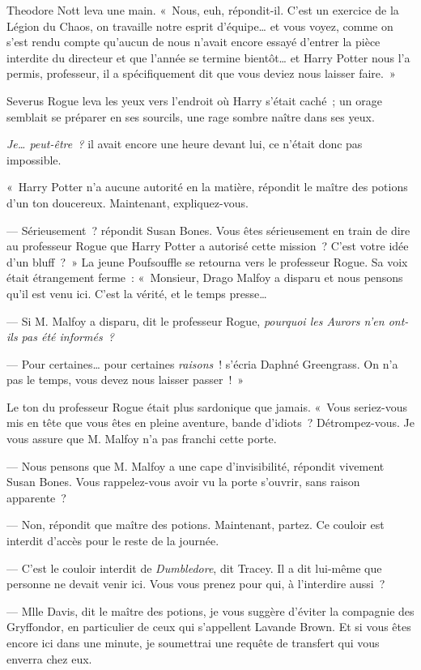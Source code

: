 Theodore Nott leva une main. «~Nous, euh, répondit-il. C'est un exercice de la Légion du Chaos, on travaille notre esprit d'équipe… et vous voyez, comme on s'est rendu compte qu'aucun de nous n'avait encore essayé d'entrer la pièce interdite du directeur et que l'année se termine bientôt… et Harry Potter nous l'a permis, professeur, il a spécifiquement dit que vous deviez nous laisser faire.~»

Severus Rogue leva les yeux vers l'endroit où Harry s'était caché~; un orage semblait se préparer en ses sourcils, une rage sombre naître dans ses yeux.

\emph{Je… peut-être~?} il avait encore une heure devant lui, ce n'était donc pas impossible.

«~Harry Potter n'a aucune autorité en la matière, répondit le maître des potions d'un ton doucereux. Maintenant, expliquez-vous.

--- Sérieusement~? répondit Susan Bones. Vous êtes sérieusement en train de dire au professeur Rogue que Harry Potter a autorisé cette mission~? C'est votre idée d'un bluff~?~» La jeune Poufsouffle se retourna vers le professeur Rogue. Sa voix était étrangement ferme~: «~Monsieur, Drago Malfoy a disparu et nous pensons qu'il est venu ici. C'est la vérité, et le temps presse…

--- Si M. Malfoy a disparu, dit le professeur Rogue, \emph{pourquoi les Aurors n'en ont-ils pas été informés~?}

--- Pour certaines… pour certaines \emph{raisons}~! s'écria Daphné Greengrass. On n'a pas le temps, vous devez nous laisser passer~!~»

Le ton du professeur Rogue était plus sardonique que jamais. «~Vous seriez-vous mis en tête que vous êtes en pleine aventure, bande d'idiots~? Détrompez-vous. Je vous assure que M. Malfoy n'a pas franchi cette porte.

--- Nous pensons que M. Malfoy a une cape d'invisibilité, répondit vivement Susan Bones. Vous rappelez-vous avoir vu la porte s'ouvrir, sans raison apparente~?

--- Non, répondit que maître des potions. Maintenant, partez. Ce couloir est interdit d'accès pour le reste de la journée.

--- C'est le couloir interdit de \emph{Dumbledore}, dit Tracey. Il a dit lui-même que personne ne devait venir ici. Vous vous prenez pour qui, à l'interdire aussi~?

--- Mlle Davis, dit le maître des potions, je vous suggère d'éviter la compagnie des Gryffondor, en particulier de ceux qui s'appellent Lavande Brown. Et si vous êtes encore ici dans une minute, je soumettrai une requête de transfert qui vous enverra chez eux.

